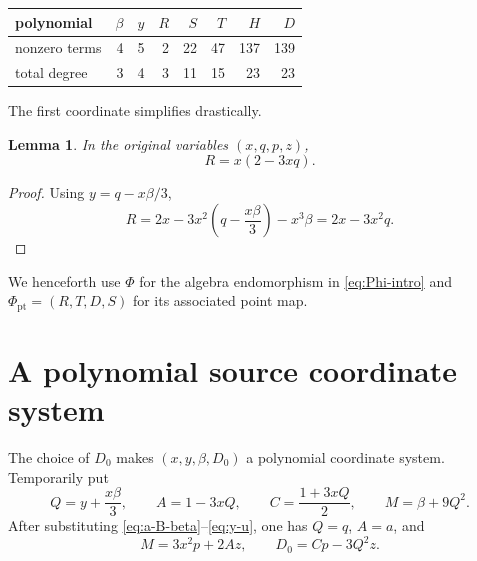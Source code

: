 \documentclass[11pt]{article}
\newtheorem{lemma}[theorem]{Lemma}
\theoremstyle{remark}
\begin{document}
\begin{center}
\begin{tabular}{@{}lrrrrrrr@{}}
\toprule
polynomial & \(\beta\) & \(y\) & \(R\) & \(S\) & \(T\) & \(H\) & \(D\)\\
\midrule
nonzero terms & 4 & 5 & 2 & 22 & 47 & 137 & 139\\
total degree  & 3 & 4 & 3 & 11 & 15 & 23 & 23\\
\bottomrule
\end{tabular}
\end{center}

The first coordinate simplifies drastically.

\begin{lemma}\label{lem:R-factorization}
In the original variables \((x,q,p,z)\),
\begin{equation}\label{eq:R-factorization}
  R=x(2-3xq).
\end{equation}
\end{lemma}

\begin{proof}
Using \(y=q-x\beta/3\),
\[
  R
  =2x-3x^2\left(q-\frac{x\beta}{3}\right)-x^3\beta
  =2x-3x^2q.
\]
\end{proof}

We henceforth use \(\Phi\) for the algebra endomorphism in
\eqref{eq:Phi-intro} and \(\Phi_{\mathrm{pt}}=(R,T,D,S)\) for its associated
point map.

\section{A polynomial source coordinate system}\label{sec:source-coordinates}

The choice of \(D_0\) makes \((x,y,\beta,D_0)\) a polynomial coordinate
system.  Temporarily put
\begin{equation}\label{eq:QACM}
  Q=y+\frac{x\beta}{3},
  \qquad
  A=1-3xQ,
  \qquad
  C=\frac{1+3xQ}{2},
  \qquad
  M=\beta+9Q^2.
\end{equation}
After substituting \eqref{eq:a-B-beta}--\eqref{eq:y-u}, one has \(Q=q\),
\(A=a\), and
\begin{equation}\label{eq:source-linear-system}
  M=3x^2p+2Az,
  \qquad
  D_0=Cp-3Q^2z.
\end{equation}
\end{document}
